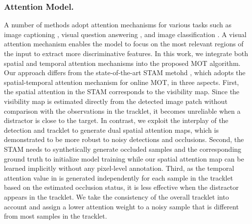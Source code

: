 \documentclass[runningheads]{llncs}
\begin{document}
  \subsubsection{Attention Model.}
  A number of methods adopt attention mechanisms for various tasks such as image captioning \cite{chen2015mind,fang2015captions,xu2015show}, visual question answering \cite{xu2016ask,yang2016stacked}, and image classification \cite{wang2017residual}. 
A visual attention mechanism enables the model to focus on the most relevant regions of the input to extract more discriminative features. 
In this work, we integrate both spatial and temporal attention mechanisms into the proposed MOT algorithm. 
Our approach differs from the state-of-the-art STAM metohd \cite{STAM}, which adopts the spatial-temporal attention mechanism for online MOT, in three aspects.
First, the spatial attention in the STAM corresponds to the visibility map. Since the visibility map is estimated directly from the  detected image patch without comparison with the observations in the tracklet, it becomes unreliable when a distractor is close to the target. 
  In contrast, we exploit the interplay of the detection and tracklet to generate dual spatial attention maps, which is demonstrated to be more robust to noisy detections and occlusions.
Second, the STAM needs to synthetically generate occluded samples and the corresponding ground truth to initialize model training while our spatial attention map can be learned implicitly without any pixel-level annotation. 
Third, as the temporal attention value in \cite{STAM} is generated independently for each sample in the tracklet based on the estimated occlusion status, it is less effective when the distractor appears in the tracklet. We take the consistency of the overall tracklet into account and assign a lower attention weight to a noisy sample that is different from most samples in the tracklet.
\end{document}
